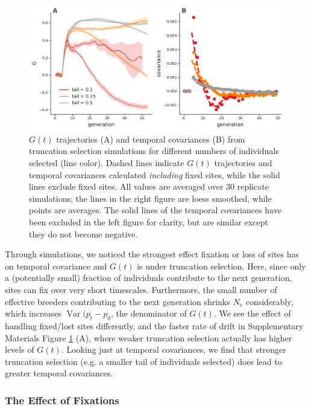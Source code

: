 \documentclass[11pt]{article}
\DeclareMathOperator{\var}{Var}
\begin{document}
\begin{figure}[!ht]
  \centering
  \includegraphics[width=\textwidth]{figures/fig-both-trunc.pdf}

  \caption{$G(t)$ trajectories (A) and temporal covariances (B) from
    truncation selection simulations for different numbers of individuals
    selected (line color). Dashed lines indicate $G(t)$ trajectories and
    temporal covariances calculated \emph{including} fixed sites, while the
    solid lines exclude fixed sites. All values are averaged over 30 replicate
    simulations; the lines in the right figure are loess smoothed, while points
    are averages. The solid lines of the temporal covariances have been
    excluded in the left figure for clarity, but are similar except they do not
    become negative.}

    \label{suppfig:supp-trunc}
\end{figure}

Through simulations, we noticed the strongest effect fixation  or loss of sites
has on temporal covariance and $G(t)$ is under truncation selection. Here,
since only a (potentially small) fraction of individuals contribute to the next
generation, sites can fix over very short timescales. Furthermore, the small
number of effective breeders contributing to the next generation shrinks $N_e$
considerably, which increases $\var(p_t - p_0$, the denominator of $G(t)$. We
see the effect of handling fixed/lost sites differently, and the faster rate of
drift in Supplementary Materials Figure \ref{suppfig:supp-trunc} (A), where
weaker truncation selection actually has higher levels of $G(t)$. Looking just
at temporal covariances, we find that stronger truncation selection (e.g.  a
smaller tail of individuals selected) does lead to greater temporal
covariances.


\subsubsection{The Effect of Fixations}
\label{supp:fixation}
\end{document}
